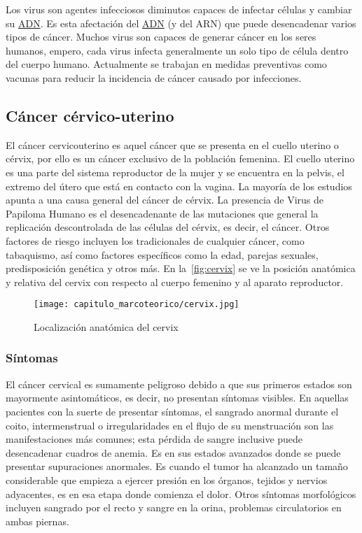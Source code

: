Los virus son agentes infecciosos diminutos capaces de infectar células y
cambiar su \hyperlink{abbr}{ADN}. Es esta afectación del \hyperlink{abbr}{ADN}
(y del ARN) que puede desencadenar varios tipos de cáncer. Muchos virus son
capaces de generar cáncer en los seres humanos, empero, cada virus infecta
generalmente un solo tipo de célula dentro del cuerpo humano. Actualmente se
trabajan en medidas preventivas como vacunas para reducir la incidencia de
cáncer causado por infecciones. 

\subsection{Cáncer cérvico-uterino}

El cáncer cervicouterino es aquel cáncer que se
presenta en el cuello uterino o cérvix, por ello es un cáncer exclusivo de la
población femenina. El cuello uterino es una parte del sistema reproductor de la
mujer y se encuentra en la pelvis, el extremo del útero que está en contacto con
la vagina. La mayoría de los estudios apunta a una causa general del cáncer de
cérvix. La presencia de Virus de Papiloma Humano es el desencadenante de las
mutaciones que general la replicación descontrolada de las células del cérvix,
es decir, el cáncer. Otros factores de riesgo incluyen los tradicionales de
cualquier cáncer, como tabaquismo, así como factores específicos como la edad,
parejas sexuales, predisposición genética y otros más. En
la~\autoref{fig:cervix} se ve la posición anatómica y relativa del cervix con
respecto al cuerpo femenino y al aparato reproductor.

\begin{figure}[H]
    \centering
    \texttt{[image: capitulo\_marcoteorico/cervix.jpg]}
    \caption{Localización anatómica del cervix}\label{fig:cervix}
\end{figure}


\subsubsection{Síntomas}

El cáncer cervical es sumamente peligroso debido a que sus primeros estados son
mayormente asintomáticos, es decir, no presentan síntomas visibles. En aquellas
pacientes con la suerte de presentar síntomas, el sangrado anormal durante el
coito, intermenstrual o irregularidades en el flujo de su menstruación son las
manifestaciones más comunes; esta pérdida de sangre inclusive puede desencadenar
cuadros de anemia. Es en sus estados avanzados donde se puede presentar
supuraciones anormales. Es cuando el tumor ha alcanzado un tamaño considerable
que empieza a ejercer presión en los órganos, tejidos y nervios  adyacentes, es
en esa etapa donde comienza el dolor. Otros síntomas morfológicos incluyen
sangrado por el recto y sangre en la orina, problemas circulatorios en ambas
piernas. 

